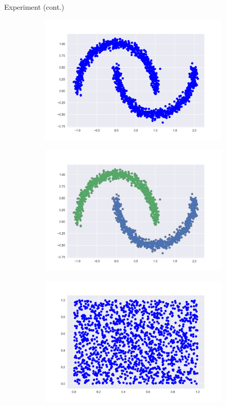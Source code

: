 \documentclass{beamer}
\begin{document}
\begin{frame}{Experiment (cont.)}
\begin{figure}[h!]
	\begin{subfigure}{.5\textwidth}
		\centering
		\includegraphics[width=.8\linewidth]{m_figure_1.png}
	\end{subfigure}%
	\begin{subfigure}{.5\textwidth}
		\centering
		\includegraphics[width=.8\linewidth]{m_figure_2.png}
	\end{subfigure}
\end{figure}
\begin{figure}[h!]
	\begin{subfigure}{.5\textwidth}
		\centering
		\includegraphics[width=.8\linewidth]{r_figure_1.png}

\end{subfigure}
\end{figure}
\end{frame}
\end{document}
